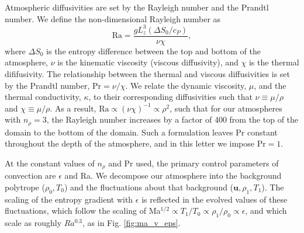 \documentclass[aps, prl, twocolumn, groupedaddress, amsfonts, amssymb, amsmath]{revtex4-1}
\begin{document}
Atmospheric diffusivities are set by the Rayleigh number and the Prandtl number.  We define the
non-dimensional Rayleigh number as
\begin{equation}
\text{Ra} = \frac{g L_z^3 (\Delta S_0 / c_P)}{\nu\chi},
\end{equation}
where $\Delta S_0$ is the entropy difference between the top and bottom of the atmosphere, 
$\nu$ is the kinematic viscosity (viscous diffusivity), and $\chi$ is the thermal dififusivity.  
The relationship between the thermal and viscous diffusivities is
set by the Prandtl number, Pr$ = \nu/\chi$.   We relate the dynamic viscosity, $\mu$, and the thermal conductivity,
$\kappa$, to their corresponding diffusivities such that 
$\nu \equiv \mu/\rho$ and $\chi \equiv \mu/\rho$.  As a result, $\text{Ra} \propto (\nu\chi)^{-1} \propto
\rho^2$, such that for our atmospheres with $n_{\rho} = 3$, the Rayleigh number increases by a factor of
400 from the top of the domain to the bottom of the domain.  Such a formulation leaves Pr
constant throughout the depth of the atmosphere, and in this letter we impose $\text{Pr} = 1$.

At the constant values of $n_\rho$ and Pr used, the primary control parameters of convection are $\epsilon$
and Ra.  We decompose our atmosphere into the background polytrope ($\rho_{0}, T_{0}$) and the fluctuations
about that background ($\bm{u}, \rho_{1}, T_{1}$).  The scaling of the entropy gradient with $\epsilon$
is reflected in the evolved values of these fluctuations, which follow the scaling of
Ma$^{1/2} \propto T_1/T_0 \propto \rho_{1}/\rho_{0} \propto \epsilon$, and which scale as roughly $Ra^{0.3}$,
as in Fig. \ref{fig:ma_v_eps}.
\end{document}
